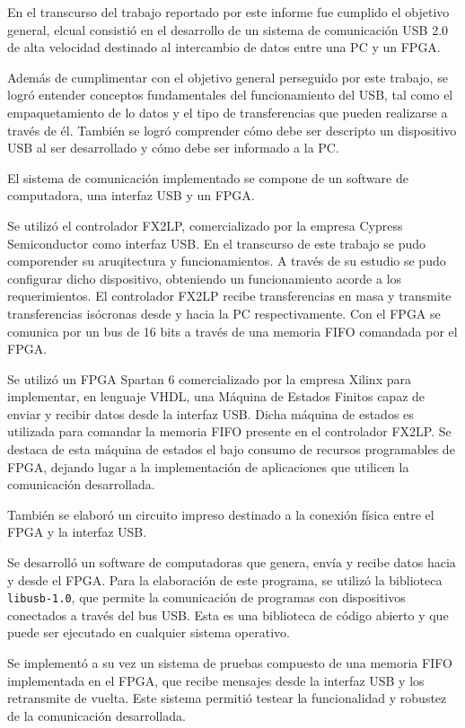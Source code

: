 En el transcurso del trabajo reportado por este informe fue cumplido el objetivo general, elcual consistió en el desarrollo de un sistema de comunicación USB 2.0 de alta velocidad destinado al intercambio de datos entre una PC y un FPGA.

Además de cumplimentar con el objetivo general perseguido por este trabajo, se logró entender conceptos fundamentales del funcionamiento del USB, tal como el empaquetamiento de lo datos y el tipo de transferencias que pueden realizarse a través de él. También se logró comprender cómo debe ser descripto un dispositivo USB al ser desarrollado y cómo debe ser informado a la PC.

El sistema de comunicación implementado se compone de un software de computadora, una interfaz USB y un FPGA.

Se utilizó el controlador FX2LP, comercializado por la empresa Cypress Semiconductor como interfaz USB. En el transcurso de este trabajo se pudo comporender su aruqitectura y funcionamientos. A través de su estudio se pudo configurar dicho dispositivo, obteniendo un funcionamiento acorde a los requerimientos. El controlador FX2LP recibe transferencias en masa y transmite transferencias isócronas desde y hacia la PC respectivamente. Con el FPGA se comunica por un bus de 16 bits a través de una memoria FIFO comandada por el FPGA.

Se utilizó un FPGA Spartan 6 comercializado por la empresa Xilinx para implementar, en lenguaje VHDL, una Máquina de Estados Finitos capaz de enviar y recibir datos desde la interfaz USB. Dicha máquina de estados es utilizada para comandar la memoria FIFO presente en el controlador FX2LP. Se destaca de esta máquina de estados el bajo consumo de recursos programables de FPGA, dejando lugar a la implementación de aplicaciones que utilicen la comunicación desarrollada.

También se elaboró un circuito impreso destinado a la conexión física entre el FPGA y la interfaz USB.

Se desarrolló un software de computadoras que genera, envía y recibe datos hacia y desde el FPGA. Para la elaboración de este programa, se utilizó la biblioteca \verb|libusb-1.0|, que permite la comunicación de programas con dispositivos conectados a través del bus USB. Esta es una biblioteca de código abierto y que puede ser ejecutado en cualquier sistema operativo.

Se implementó a su vez un sistema de pruebas compuesto de una memoria FIFO implementada en el FPGA, que recibe mensajes desde la interfaz USB y los retransmite de vuelta. Este sistema permitió testear la funcionalidad y robustez de la comunicación desarrollada.


